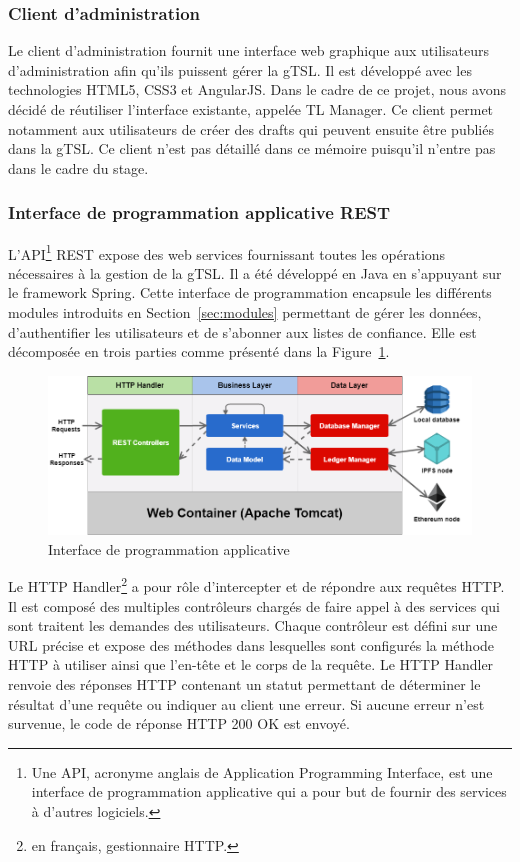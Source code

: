 \documentclass{tnreport}
\begin{document}
\subsubsection{Client d'administration}

Le client d'administration fournit une interface web graphique aux utilisateurs d'administration afin qu'ils puissent gérer la gTSL. Il est développé avec les technologies HTML5, CSS3 et AngularJS. Dans le cadre de ce projet, nous avons décidé de réutiliser l'interface existante, appelée TL Manager. Ce client permet notamment aux utilisateurs de créer des drafts qui peuvent ensuite être publiés dans la gTSL. Ce client n'est pas détaillé dans ce mémoire puisqu'il n'entre pas dans le cadre du stage.

\subsubsection{Interface de programmation applicative REST}

L'API\footnote{Une API, acronyme anglais de Application Programming Interface, est une interface de programmation applicative qui a pour but de fournir des services à d'autres logiciels.} REST expose des web services fournissant toutes les opérations nécessaires à la gestion de la gTSL. Il a été développé en Java en s'appuyant sur le framework Spring. Cette interface de programmation encapsule les différents modules introduits en Section~\ref{sec:modules} permettant de gérer les données, d'authentifier les utilisateurs et de s'abonner aux listes de confiance. Elle est décomposée en trois parties comme présenté dans la Figure~\ref{fig:rest-api}.

\begin{figure}[h]
	\centering
	\includegraphics[scale=0.52]{figures/rest-api}
	\caption{Interface de programmation applicative}
	\label{fig:rest-api}
\end{figure}

Le HTTP Handler\footnote{en français, gestionnaire HTTP.} a pour rôle d'intercepter et de répondre aux requêtes HTTP. Il est composé des multiples contrôleurs chargés de faire appel à des services qui sont traitent les demandes des utilisateurs. Chaque contrôleur est défini sur une URL précise et expose des méthodes dans lesquelles sont configurés la méthode HTTP à utiliser ainsi que l'en-tête et le corps de la requête. Le HTTP Handler renvoie des réponses HTTP contenant un statut permettant de déterminer le résultat d'une requête ou indiquer au client une erreur. Si aucune erreur n'est survenue, le code de réponse HTTP 200 OK est envoyé.
\end{document}
